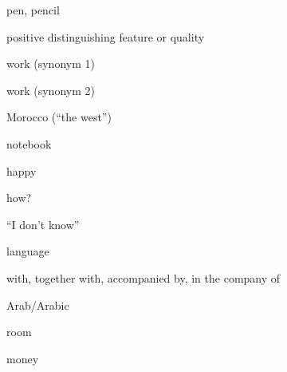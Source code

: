 \documentclass[avery5371,grid,frame]{flashcards}
\begin{document}
\begin{flashcard}{\LARGE pen, pencil}
\LARGE {}
\end{flashcard}
\begin{flashcard}{\LARGE positive distinguishing feature or quality}
\LARGE {}
\end{flashcard}
\begin{flashcard}{\LARGE work (synonym 1)}
\LARGE {}
\end{flashcard}
\begin{flashcard}{\LARGE work (synonym 2)}
\LARGE {}
\end{flashcard}
\begin{flashcard}{\LARGE Morocco (``the west'')}
\LARGE {}
\end{flashcard}
\begin{flashcard}{\LARGE notebook}
\LARGE {}
\end{flashcard}
\begin{flashcard}{\LARGE happy}
\LARGE {}
\end{flashcard}
\begin{flashcard}{\LARGE how?}
\LARGE {}
\end{flashcard}
\begin{flashcard}{\LARGE ``I don't know''}
\LARGE {}
\end{flashcard}
\begin{flashcard}{\LARGE language}
\LARGE {}
\end{flashcard}
\begin{flashcard}{\LARGE with, together with, accompanied by, in the company of}
\LARGE {}
\end{flashcard}
\begin{flashcard}{\LARGE Arab/Arabic}
\LARGE {}
\end{flashcard}
\begin{flashcard}{\LARGE room}
\LARGE {}
\end{flashcard}
\begin{flashcard}{\LARGE money}
\LARGE {}
\end{flashcard}
\end{document}
